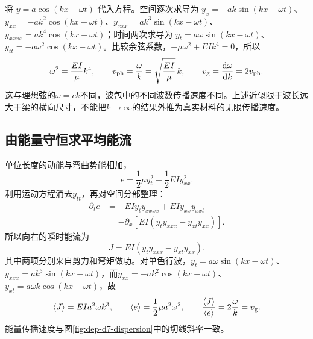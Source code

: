 将 $y=a\cos(kx-\omega t)$ 代入方程。空间逐次求导为 $y_x=-ak\sin(kx-\omega t)$、$y_{xx}=-ak^2\cos(kx-\omega t)$、$y_{xxx}=ak^3\sin(kx-\omega t)$、$y_{xxxx}=ak^4\cos(kx-\omega t)$；时间两次求导为 $y_t=a\omega\sin(kx-\omega t)$、$y_{tt}=-a\omega^2\cos(kx-\omega t)$。比较余弦系数，$-\mu\omega^2+EIk^4=0$，所以
\[
 \omega^2=\frac{EI}{\mu}k^4,\qquad
 v_{\rm ph}=\frac{\omega}{k}=\sqrt{\frac{EI}{\mu}}\,k,\qquad
 v_{\rm g}=\frac{\mathop{}\!\mathrm d\omega}{\mathop{}\!\mathrm d k}=2v_{\rm ph}.
\]
这与理想弦的$\omega=ck$不同，波包中的不同波数传播速度不同。上述近似限于波长远大于梁的横向尺寸，不能把$k\to\infty$的结果外推为真实材料的无限传播速度。
\subsection{由能量守恒求平均能流}
单位长度的动能与弯曲势能相加，
\[
 e=\frac12\mu y_t^2+\frac12EIy_{xx}^2.
\]
利用运动方程消去$y_{tt}$，再对空间分部整理：
\begin{align*}
 \partial_te
 &=-EIy_ty_{xxxx}+EIy_{xx}y_{xxt}\\
 &=-\partial_x\!\left[EI(y_ty_{xxx}-y_{xt}y_{xx})\right].
\end{align*}
所以向右的瞬时能流为
\[
 J=EI(y_ty_{xxx}-y_{xt}y_{xx}).
\]
其中两项分别来自剪力和弯矩做功。对单色行波，$y_t=a\omega\sin(kx-\omega t)$、$y_{xxx}=ak^3\sin(kx-\omega t)$，而$y_{xx}=-ak^2\cos(kx-\omega t)$、$y_{xt}=a\omega k\cos(kx-\omega t)$，故
\[
 \langle J\rangle=EIa^2\omega k^3,\qquad
 \langle e\rangle=\frac12\mu a^2\omega^2,\qquad
 \frac{\langle J\rangle}{\langle e\rangle}=2\frac\omega k=v_{\rm g}.
\]
能量传播速度与图\ref{fig:dep-d7-dispersion}中的切线斜率一致。

